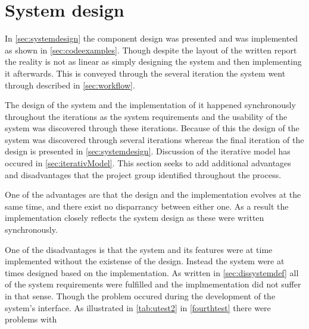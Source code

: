 \section{System design}

In \cref{sec:systemdesign} the component design was presented and was implemented as shown in \cref{sec:codeexamples}.
Though despite the layout of the written report the reality is not as linear as simply designing the system and then implementing it afterwards.
This is conveyed through the several iteration the system went through described in \cref{sec:workflow}.

The design of the system and the implementation of it happened synchronously throughout the iterations as the system requirements and the usability of the system was discovered through these iterations.
Because of this the design of the system was discovered through several iterations whereas the final iteration of the design is presented in \cref{sec:systemdesign}.
Discussion of the iterative model has occured in \cref{sec:iterativModel}.
This section seeks to add additional advantages and disadvantages that the project group identified throughout the process.

One of the advantages are that the design and the implementation evolves at the same time, and there exist no disparrancy between either one.
As a result the implementation closely reflects the system design as these were written synchronously.

One of the disadvantages is that the system and its features were at time implemented without the existense of the design.
Instead the system were at times designed based on the implementation.
As written in \cref{sec:dissystemdef} all of the system requirements were fulfilled and the implmementation did not suffer in that sense.
Though the problem occured during the development of the system's interface.
As illustrated in \cref{tab:utest2} in \cref{fourthtest} there were problems with 
